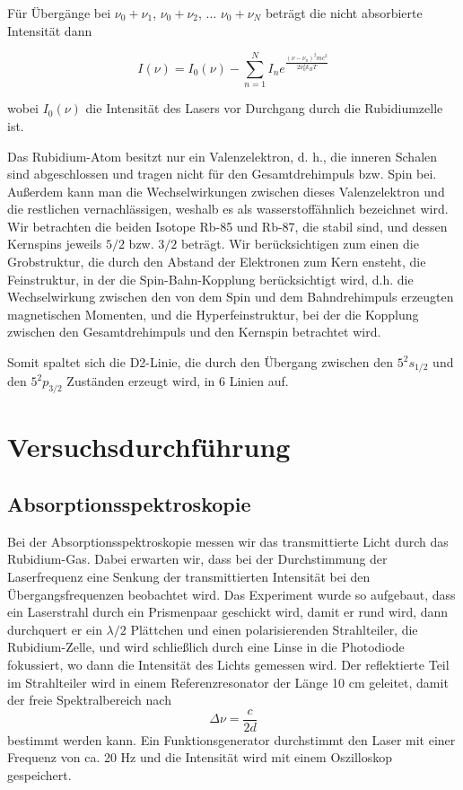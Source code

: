 \documentclass[a4paper,parskip]{scrartcl}
\begin{document}
Für Übergänge bei $\nu_0 + \nu_1$, $\nu_0+\nu_2$, ... $\nu_0 + \nu_N$ beträgt die nicht absorbierte Intensität dann

\begin{equation}
I(\nu) = I_0(\nu) - \sum_{n=1}^N I_n e^{\frac{(\nu-\nu_n)^2mc^2}{2\nu_0^2 k_B T}}
\label{AbsorbtionFit}
\end{equation}

wobei $I_0(\nu)$ die Intensität des Lasers vor Durchgang durch die Rubidiumzelle ist.

Das Rubidium-Atom besitzt nur ein Valenzelektron, d. h., die inneren Schalen sind abgeschlossen und tragen nicht für den Gesamtdrehimpuls bzw. Spin bei. Außerdem kann man die Wechselwirkungen zwischen dieses Valenzelektron und die restlichen vernachlässigen, weshalb es als wasserstoffähnlich bezeichnet wird. Wir betrachten die beiden Isotope Rb-85 und Rb-87, die stabil sind, und dessen Kernspins jeweils $5/2$ bzw. $3/2$ beträgt. Wir berücksichtigen zum einen die Grobstruktur, die durch den Abstand der Elektronen zum Kern ensteht, die Feinstruktur, in der die Spin-Bahn-Kopplung berücksichtigt wird, d.h. die Wechselwirkung zwischen den von dem Spin und dem Bahndrehimpuls erzeugten magnetischen Momenten, und die Hyperfeinstruktur, bei der die Kopplung zwischen den Gesamtdrehimpuls und den Kernspin betrachtet wird.

Somit spaltet sich die D2-Linie, die durch den Übergang zwischen den $5^2s_{1/2}$ und den $5^2p_{3/2}$ Zuständen erzeugt wird, in 6 Linien auf.

\section{Versuchsdurchführung}

\subsection{Absorptionsspektroskopie}

 Bei der Absorptionsspektroskopie messen wir das transmittierte Licht durch das Rubidium-Gas. Dabei erwarten wir, dass bei der Durchstimmung der Laserfrequenz eine Senkung der transmittierten Intensität bei den Übergangsfrequenzen beobachtet wird. Das Experiment wurde so aufgebaut, dass ein Laserstrahl durch ein Prismenpaar geschickt wird, damit er rund wird, dann durchquert er ein $\lambda /2$ Plättchen und einen polarisierenden Strahlteiler, die Rubidium-Zelle, und wird schließlich durch eine Linse in die Photodiode fokussiert, wo dann die Intensität des Lichts gemessen wird. Der reflektierte Teil im Strahlteiler wird in einem Referenzresonator der Länge 10 cm geleitet, damit der freie Spektralbereich nach 
\begin{equation*}
	\Delta \nu = \frac{c}{2d}
\end{equation*}
bestimmt werden kann.
Ein Funktionsgenerator durchstimmt den Laser mit einer Frequenz von ca. 20 Hz und die Intensität wird mit einem Oszilloskop gespeichert.
\end{document}
